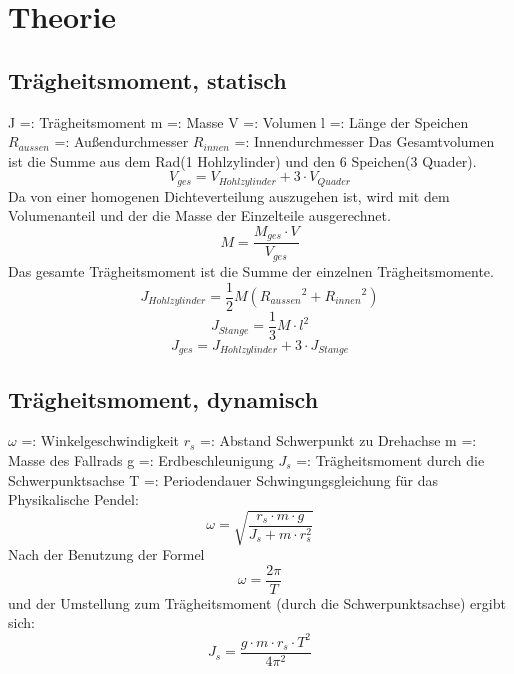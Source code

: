 \section{Theorie}
\subsection{Trägheitsmoment, statisch}
J =: Trägheitsmoment
\newline
m =: Masse
\newline
V =: Volumen
\newline
l =: Länge der Speichen
\newline
$R_{aussen}$ =: Außendurchmesser
\newline
$R_{innen}$ =: Innendurchmesser
\newline
Das Gesamtvolumen ist die Summe aus dem Rad(1 Hohlzylinder) und den 6 Speichen(3 Quader).
\begin{equation}
V_{ges} = V_{Hohlzylinder} + 3\cdot V_{Quader}
\end{equation}
Da von einer homogenen Dichteverteilung auszugehen ist, wird mit dem Volumenanteil und der die Masse der Einzelteile ausgerechnet.
\begin{equation}
M = \frac{M_{ges}\cdot V}{V_{ges}}
\end{equation}
Das gesamte Trägheitsmoment ist die Summe der einzelnen Trägheitsmomente.
\begin{equation}
J_{Hohlzylinder} = \frac{1}{2}M({R_{aussen}}^{2}+{R_{innen}}^{2})
\end{equation}
\begin{equation}
J_{Stange} = \frac{1}{3}M\cdot l^{2}
\end{equation}
\begin{equation}
J_{ges} = J_{Hohlzylinder}+3\cdot J_{Stange}
\end{equation}
\subsection{Trägheitsmoment, dynamisch}
$\omega$ =: Winkelgeschwindigkeit
\newline
$r_{s}$ =: Abstand Schwerpunkt zu Drehachse
\newline
m =: Masse des Fallrads
\newline
g =: Erdbeschleunigung
\newline
$J_{s}$ =: Trägheitsmoment durch die Schwerpunktsachse
\newline
T =: Periodendauer
\newline
\newline
Schwingungsgleichung für das Physikalische Pendel:
\begin{equation}
\omega = \sqrt{\frac{r_{s}\cdot m\cdot g}{J_{s}+m\cdot r_{s}^{2}}}
\end{equation}
Nach der Benutzung der Formel
\begin{equation}
\omega = \frac{2\pi}{T}
\end{equation}
und der Umstellung zum Trägheitsmoment (durch die Schwerpunktsachse) ergibt sich:
\begin{equation}
J_{s} = \frac{g\cdot m\cdot r_{s} \cdot T^{2}}{4\pi^{2}}
\end{equation}